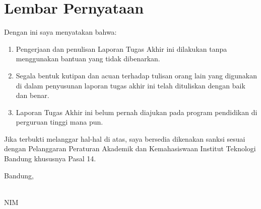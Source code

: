 
\clearpage
\pagestyle{empty}

\chapter*{Lembar Pernyataan}


Dengan ini saya menyatakan bahwa:

\begin{enumerate}[leftmargin=*]
    \item Pengerjaan dan penulisan Laporan Tugas Akhir ini dilakukan tanpa menggunakan bantuan yang tidak dibenarkan.
    \item Segala bentuk kutipan dan acuan terhadap tulisan orang lain yang digunakan di dalam penyusunan laporan tugas akhir ini telah dituliskan dengan baik dan benar.
    \item Laporan Tugas Akhir ini belum pernah diajukan pada program pendidikan di perguruan tinggi mana pun.
\end{enumerate}

Jika terbukti melanggar hal-hal di atas, saya bersedia dikenakan sanksi sesuai dengan Pelanggaran Peraturan Akademik dan Kemahasiswaan Institut Teknologi Bandung khususnya Pasal 14.

\vspace{15mm}

Bandung, \tanggallengkap

\vspace{3cm}
\underline{\penulis} \\
NIM \nim

\clearpage
